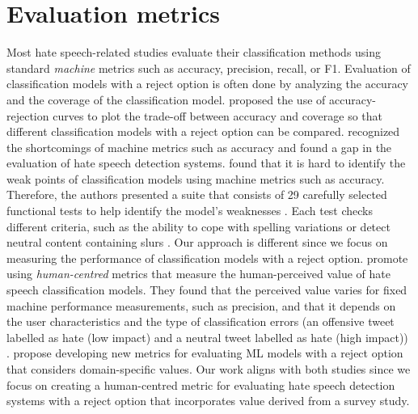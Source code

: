 \section{Evaluation metrics}
Most hate speech-related studies evaluate their classification methods using standard \textit{machine} metrics such as accuracy, precision, recall, or F1.
% 
Evaluation of classification models with a reject option is often done by analyzing the accuracy and the coverage of the classification model.
%
\citet{nadeem2009reject} proposed the use of accuracy-rejection curves to plot the trade-off between accuracy and coverage so that different classification models with a reject option can be compared.
%
\citet{rottger2020hatecheck, casati2021value, olteanu2017limits} recognized the shortcomings of machine metrics such as accuracy and found a gap in the evaluation of hate speech detection systems.
%
\citet{rottger2020hatecheck} found that it is hard to identify the weak points of classification models using machine metrics such as accuracy.
%
Therefore, the authors presented a suite that consists of 29 carefully selected functional tests to help identify the model's weaknesses \citep{rottger2020hatecheck}.
%
Each test checks different criteria, such as the ability to cope with spelling variations or detect neutral content containing slurs \citep{rottger2020hatecheck}.
%
Our approach is different since we focus on measuring the performance of classification models with a reject option.
%
\citet{olteanu2017limits} promote using \textit{human-centred} metrics that measure the human-perceived value of hate speech classification models.
%
They found that the perceived value varies for fixed machine performance measurements, such as precision, and that it depends on the user characteristics and the type of classification errors (an offensive tweet labelled as hate (low impact) and a neutral tweet labelled as hate (high impact)) \citep{olteanu2017limits}.
%
\citet{casati2021value} propose developing new metrics for evaluating ML models with a reject option that considers domain-specific values.
%
Our work aligns with both studies since we focus on creating a human-centred metric for evaluating hate speech detection systems with a reject option that incorporates value derived from a survey study.